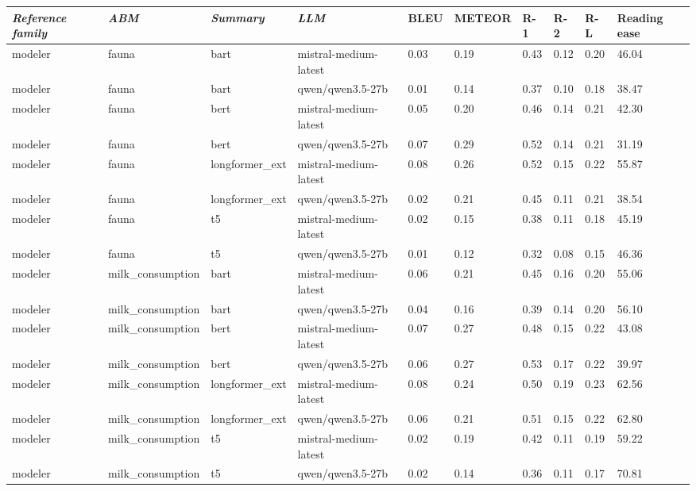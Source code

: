 \begin{tabular}{|l|l|l|l|l|l|l|l|l|l|}
\hline
\textit{\textbf{Reference family}} & \textit{\textbf{ABM}} & \textit{\textbf{Summary}} & \textit{\textbf{LLM}} & BLEU & METEOR & R-1 & R-2 & R-L & Reading ease \\
 \hline
 modeler & fauna & bart & mistral-medium-latest & 0.03 & 0.19 & 0.43 & 0.12 & 0.20 & 46.04 \\
 \hline
 modeler & fauna & bart & qwen/qwen3.5-27b & 0.01 & 0.14 & 0.37 & 0.10 & 0.18 & 38.47 \\
 \hline
 modeler & fauna & bert & mistral-medium-latest & 0.05 & 0.20 & 0.46 & 0.14 & 0.21 & 42.30 \\
 \hline
 modeler & fauna & bert & qwen/qwen3.5-27b & 0.07 & 0.29 & 0.52 & 0.14 & 0.21 & 31.19 \\
 \hline
 modeler & fauna & longformer\_ext & mistral-medium-latest & 0.08 & 0.26 & 0.52 & 0.15 & 0.22 & 55.87 \\
 \hline
 modeler & fauna & longformer\_ext & qwen/qwen3.5-27b & 0.02 & 0.21 & 0.45 & 0.11 & 0.21 & 38.54 \\
 \hline
 modeler & fauna & t5 & mistral-medium-latest & 0.02 & 0.15 & 0.38 & 0.11 & 0.18 & 45.19 \\
 \hline
 modeler & fauna & t5 & qwen/qwen3.5-27b & 0.01 & 0.12 & 0.32 & 0.08 & 0.15 & 46.36 \\
 \hline
 modeler & milk\_consumption & bart & mistral-medium-latest & 0.06 & 0.21 & 0.45 & 0.16 & 0.20 & 55.06 \\
 \hline
 modeler & milk\_consumption & bart & qwen/qwen3.5-27b & 0.04 & 0.16 & 0.39 & 0.14 & 0.20 & 56.10 \\
 \hline
 modeler & milk\_consumption & bert & mistral-medium-latest & 0.07 & 0.27 & 0.48 & 0.15 & 0.22 & 43.08 \\
 \hline
 modeler & milk\_consumption & bert & qwen/qwen3.5-27b & 0.06 & 0.27 & 0.53 & 0.17 & 0.22 & 39.97 \\
 \hline
 modeler & milk\_consumption & longformer\_ext & mistral-medium-latest & 0.08 & 0.24 & 0.50 & 0.19 & 0.23 & 62.56 \\
 \hline
 modeler & milk\_consumption & longformer\_ext & qwen/qwen3.5-27b & 0.06 & 0.21 & 0.51 & 0.15 & 0.22 & 62.80 \\
 \hline
 modeler & milk\_consumption & t5 & mistral-medium-latest & 0.02 & 0.19 & 0.42 & 0.11 & 0.19 & 59.22 \\
 \hline
 modeler & milk\_consumption & t5 & qwen/qwen3.5-27b & 0.02 & 0.14 & 0.36 & 0.11 & 0.17 & 70.81 \\
\hline
\end{tabular}
